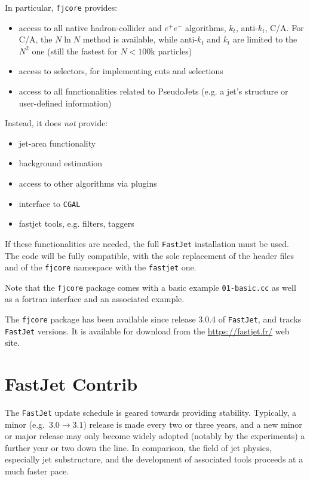 \documentclass[12pt,a4]{article}
\newcommand{\fastjet}{\texttt{FastJet}\xspace}
\newcommand{\fjcore}{\texttt{fjcore}\xspace}
\newcommand{\ttt}[1]{{\small\texttt{#1}}}
\begin{document}
In particular, \ttt{fjcore} provides:
\begin{itemize}
\item access to all native hadron-collider and $e^+e^-$ algorithms,
  $k_t$, anti-$k_t$, C/A.  For C/A, the $N\ln N$ method is available,
  while anti-$k_t$ and $k_t$ are limited to the $N^2$ one (still the
  fastest for $N < 100$k particles)
  \item access to selectors, for implementing cuts and selections
  \item access to all functionalities related to PseudoJets (e.g. a jet's
    structure or user-defined information)
\end{itemize}
Instead, it does \emph{not} provide:
\begin{itemize}
  \item jet-area functionality
  \item background estimation
  \item access to other algorithms via plugins
  \item interface to \ttt{CGAL}
  \item fastjet tools, e.g. filters, taggers
\end{itemize}
%
If these functionalities are needed, the full \fastjet installation must be
used. The code will be fully compatible, with the sole replacement of the
header files and of the \ttt{fjcore} namespace with the \ttt{fastjet} one.

Note that the \fjcore package comes with a basic example
\ttt{01-basic.cc} as well as a fortran interface and an associated
example.

The \fjcore package has been available since release 3.0.4 of
\fastjet, and tracks \fastjet versions.
%
It is available for download from the \url{https://fastjet.fr/} web
site.


\section{FastJet Contrib}
\label{sec:fjcontrib}

The \fastjet update schedule is geared towards providing stability.
%
Typically, a minor (e.g.\ $3.0 \to 3.1$) release is made every two or
three years, and a new minor or major release may only become widely
adopted (notably by the experiments) a further year or two down the
line.
%
In comparison, the field of jet physics, especially jet substructure,
and the development of associated tools proceeds at a much faster pace.
\end{document}
